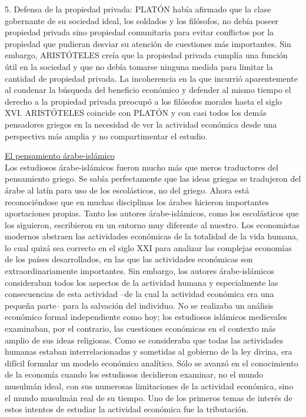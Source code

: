 \documentclass[10pt,a4paper]{article}
\begin{document}
5.
Defensa de la propiedad privada: PLATÓN había afirmado que la clase gobernante de su sociedad ideal, los soldados y los filósofos, no debía poseer propiedad privada sino propiedad comunitaria para evitar conflictos por la propiedad que pudieran desviar su atención de cuestiones más importantes. Sin embargo, ARISTÓTELES creía que la propiedad privada cumplía una función útil en la sociedad y que no debía tomarse ninguna medida para limitar la cantidad de propiedad privada. La incoherencia en la que incurrió aparentemente al condenar la búsqueda del beneficio económico y defender al mismo tiempo el derecho a la propiedad privada preocupó a los filósofos morales hasta el siglo XVI.
ARISTÓTELES coincide con PLATÓN y con casi todos los demás pensadores griegos en la necesidad de ver la actividad económica desde una perspectiva más amplia y no compartimentar el estudio.

\underline{El pensamiento árabe-islámico}\\
Los estudiosos árabe-islámicos fueron mucho más que meros traductores del pensamiento griego. Se sabía perfectamente que las ideas griegas se tradujeron del árabe al latín para uso de los escolásticos, no del griego. Ahora está reconociéndose que en muchas disciplinas los árabes hicieron importantes aportaciones propias.
Tanto los autores árabe-islámicos, como los escolásticos que los siguieron, escribieron en un entorno muy diferente al nuestro. Los economistas modernos abstraen las actividades económicas de la totalidad de la vida humana, lo cual quizá sea correcto en el siglo XXI para analizar las complejas economías de los países desarrollados, en las que las actividades económicas son extraordinariamente importantes. Sin embargo, los autores árabe-islámicos consideraban todos los aspectos de la actividad humana y especialmente las consecuencias de esta actividad –de la cual la actividad económica era una pequeña parte– para la salvación del individuo. No se realizaba un análisis económico formal independiente como hoy; los estudiosos islámicos medievales examinaban, por el contrario, las cuestiones económicas en el contexto más amplio de sus ideas religiosas.
Como se consideraba que todas las actividades humanas estaban interrelacionadas y sometidas al gobierno de la ley divina, era difícil formular un modelo económico analítico. Sólo se avanzó en el conocimiento de la economía cuando los estudiosos decidieron examinar, no el mundo musulmán ideal, con sus numerosas limitaciones de la actividad económica, sino el mundo musulmán real de su tiempo. Uno de los primeros temas de interés de estos intentos de estudiar la actividad económica fue la tributación.
\end{document}
